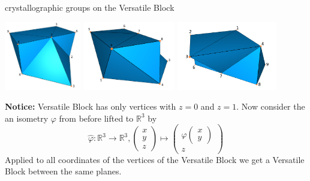 \documentclass{beamer}
\numberwithin{equation}{aufgabe}
\newcommand\R{\mathbb R}
\renewcommand{\phi}{\varphi}
\begin{document}
\begin{frame}{crystallographic groups on the Versatile Block}
    \begin{center}    
        \includegraphics[width=0.25\textwidth]{images/versatile-front.png}
        \includegraphics[width=0.3\textwidth]{images/versatile-back.png}
        \includegraphics[width=0.33\textwidth]{images/versatile-square.png}
    \end{center}
    \pause
    \textbf{Notice:} Versatile Block has only vertices with $z=0$ and $z=1$.
    Now consider the an isometry $\phi$ from before lifted to $\R^3$ by
    $$
    \hat \phi : \R^3 \to \R^3, \begin{pmatrix}x \\ y \\ z \end{pmatrix} \mapsto  \begin{pmatrix} \phi \begin{pmatrix}x \\ y \end{pmatrix} \\ z \end{pmatrix}
    $$
    Applied to all coordinates of the vertices of the Versatile Block we get a Versatile Block between the same planes.
\end{frame}
\end{document}
